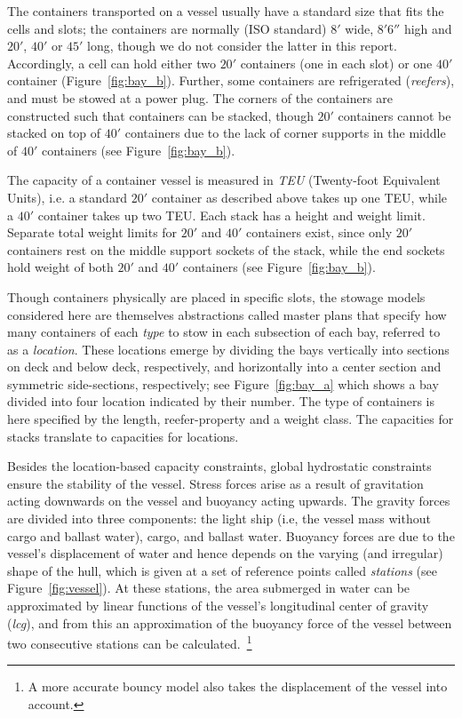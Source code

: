 The containers transported on a vessel usually have a standard size that fits the cells and slots; the containers are normally (ISO standard) $8'$ wide, $8'6''$ high and $20'$,
$40'$ or $45'$ long, though we do not consider the latter in this report. Accordingly, a cell can hold either two $20'$ containers (one in each slot) or one $40'$ container (Figure~\ref{fig:bay_b}). Further, some containers are refrigerated (\emph{reefers}), and must be stowed at a power plug. 
The corners of the containers are constructed such that containers can be stacked, though $20'$ containers cannot
be stacked on top of $40'$ containers due to the lack of corner supports in the middle of $40'$ containers (see Figure~\ref{fig:bay_b}). 

The capacity of a container vessel is measured in \emph{TEU} (Twenty-foot Equivalent Units), i.e. a standard $20'$ container as described above takes up one TEU, while a $40'$ container takes up two TEU. Each stack has a height and weight limit. Separate total weight limits for $20'$ and $40'$ containers exist, since only $20'$ containers rest on the middle support sockets of the stack, while the end sockets hold weight of both $20'$ and $40'$ containers (see Figure~\ref{fig:bay_b}). 

Though containers physically are placed in specific slots, the stowage models considered here are themselves abstractions called master plans that specify how many containers of each \emph{type} to stow in each subsection of each bay, referred to as a {\em location}. These locations emerge by dividing the bays {vertically} into sections on deck and below deck, respectively, and {horizontally} into a center section and symmetric side-sections, respectively; see Figure~\ref{fig:bay_a} which shows a bay divided into four location indicated by their number. The type of containers is here specified by the length, reefer-property and a weight class. The capacities for stacks translate to capacities for locations.

Besides the location-based capacity constraints, global hydrostatic constraints ensure the stability of the vessel. Stress forces arise as a result of gravitation acting downwards on the vessel and buoyancy acting upwards. The gravity forces are divided into three components: the light ship (i.e, the vessel mass without cargo and ballast water), cargo, and ballast water. Buoyancy forces are due to the vessel's displacement of water and hence depends on the varying (and irregular) shape of the hull, which is given at a set of reference points called \emph{stations} (see Figure~\ref{fig:vessel}). At these stations, the area submerged in water can be approximated by linear functions of the vessel's  longitudinal center of gravity (\emph{lcg}), and from this an approximation of the buoyancy force of the vessel between two consecutive stations can be calculated.~\footnote{A more accurate bouncy model also takes the displacement of the vessel into account.}

